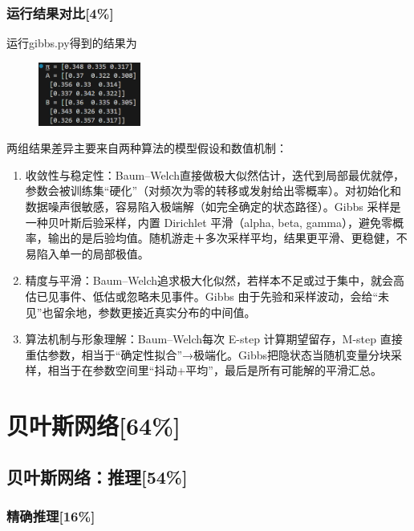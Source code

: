 \documentclass{article}
\begin{document}
\subsubsection{运行结果对比[4\%]}
运行gibbs.py得到的结果为
\begin{figure}[htbp]
	\centering
	\includegraphics[width=0.3\textwidth]{2.png}
\end{figure}
\FloatBarrier
两组结果差异主要来自两种算法的模型假设和数值机制：
\begin{enumerate}
	\item 收敛性与稳定性：Baum–Welch直接做极大似然估计，迭代到局部最优就停，参数会被训练集“硬化”（对频次为零的转移或发射给出零概率）。对初始化和数据噪声很敏感，容易陷入极端解（如完全确定的状态路径）。Gibbs 采样是一种贝叶斯后验采样，内置 Dirichlet 平滑（alpha, beta, gamma），避免零概率，输出的是后验均值。随机游走＋多次采样平均，结果更平滑、更稳健，不易陷入单一的局部极值。
	\item 精度与平滑：Baum–Welch追求极大化似然，若样本不足或过于集中，就会高估已见事件、低估或忽略未见事件。Gibbs 由于先验和采样波动，会给“未见”也留余地，参数更接近真实分布的中间值。
	\item 算法机制与形象理解：Baum–Welch每次 E-step 计算期望留存，M-step 直接重估参数，相当于“确定性拟合”→极端化。Gibbs把隐状态当随机变量分块采样，相当于在参数空间里“抖动+平均”，最后是所有可能解的平滑汇总。
\end{enumerate}

\section{贝叶斯网络[64\%]}
\subsection{贝叶斯网络：推理[54\%]}
\subsubsection{精确推理[16\%]}
\end{document}
